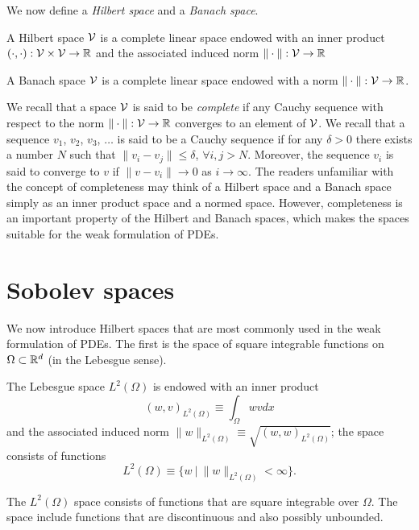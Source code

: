We now define a \emph{Hilbert space} and a \emph{Banach space}.
\begin{definition}
  A Hilbert space $\mathcal{V}$ is a complete linear space endowed with an inner product $(\cdot,\cdot): \mathcal{V} \times \mathcal{V} \to \mathbb{R}$ and the associated induced norm $\| \cdot \|: \mathcal{V} \to \mathbb{R}$ 
\end{definition}
\begin{definition}
  A Banach space $\mathcal{V}$ is a complete linear space endowed with a norm $\| \cdot \|: \mathcal{V} \to \mathbb{R}$.
\end{definition}
We recall that a space $\mathcal{V}$ is said to be \emph{complete} if any Cauchy sequence with respect to the norm $\| \cdot \|: \mathcal{V} \to \mathbb{R}$ converges to an element of $\mathcal{V}$.  We recall that a sequence $v_1$, $v_2$, $v_3$, $\dots$ is said to be a Cauchy sequence if for any $\delta > 0$ there exists a number $N$ such that $\| v_i - v_j \| \leq \delta$, $\forall i,j  > N$.  Moreover, the sequence $v_i$ is said to converge to $v$ if $\| v - v_i \| \to 0$ as $i \to \infty$. The readers unfamiliar with the concept of completeness may think of a Hilbert space and a Banach space simply as an inner product space and a normed space. However, completeness is an important property of the Hilbert and Banach spaces, which makes the spaces suitable for the weak formulation of PDEs.

\section{Sobolev spaces}
We now introduce Hilbert spaces that are most commonly used in the weak formulation of PDEs.  The first is the space of square integrable functions on $\Omega \subset \mathbb{R}^d$ (in the Lebesgue sense).
\begin{definition}
  The Lebesgue space $L^2(\Omega)$ is endowed with an inner product
  \begin{equation*}
    (w,v)_{L^2(\Omega)} \equiv \int_\Omega w v dx
  \end{equation*}
  and the associated induced norm $\| w \|_{L^2(\Omega)} \equiv \sqrt{(w,w)_{L^2(\Omega)}}$; the space consists of functions
  \begin{equation*}
    L^2(\Omega) \equiv \{ w \ | \ \| w \|_{L^2(\Omega)} < \infty \}.
  \end{equation*}
\end{definition}
The $L^2(\Omega)$ space consists of functions that are square integrable over $\Omega$.  The space include functions that are discontinuous and also possibly unbounded.  

